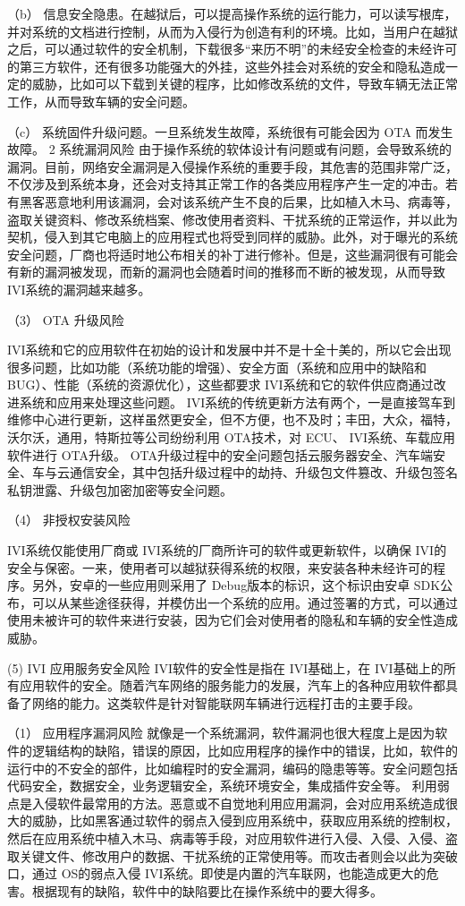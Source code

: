 （b） 信息安全隐患。在越狱后，可以提高操作系统的运行能力，可以读写根库，并对系统的文档进行控制，从而为入侵行为创造有利的环境。比如，当用户在越狱之后，可以通过软件的安全机制，下载很多“来历不明”的未经安全检查的未经许可的第三方软件，还有很多功能强大的外挂，这些外挂会对系统的安全和隐私造成一定的威胁，比如可以下载到关键的程序，比如修改系统的文件，导致车辆无法正常工作，从而导致车辆的安全问题。 

（c） 系统固件升级问题。一旦系统发生故障，系统很有可能会因为 OTA 而发生故障。
2 系统漏洞风险    
由于操作系统的软体设计有问题或有问题，会导致系统的漏洞。目前，网络安全漏洞是入侵操作系统的重要手段，其危害的范围非常广泛，不仅涉及到系统本身，还会对支持其正常工作的各类应用程序产生一定的冲击。若有黑客恶意地利用该漏洞，会对该系统产生不良的后果，比如植入木马、病毒等，盗取关键资料、修改系统档案、修改使用者资料、干扰系统的正常运作，并以此为契机，侵入到其它电脑上的应用程式也将受到同样的威胁。此外，对于曝光的系统安全问题，厂商也将适时地公布相关的补丁进行修补。但是，这些漏洞很有可能会有新的漏洞被发现，而新的漏洞也会随着时间的推移而不断的被发现，从而导致 IVI系统的漏洞越来越多。

（3） OTA 升级风险 

IVI系统和它的应用软件在初始的设计和发展中并不是十全十美的，所以它会出现很多问题，比如功能（系统功能的增强）、安全方面（系统和应用中的缺陷和 BUG）、性能（系统的资源优化），这些都要求 IVI系统和它的软件供应商通过改进系统和应用来处理这些问题。
IVI系统的传统更新方法有两个，一是直接驾车到维修中心进行更新，这样虽然更安全，但不方便，也不及时；丰田，大众，福特，沃尔沃，通用，特斯拉等公司纷纷利用 OTA技术，对 ECU、 IVI系统、车载应用软件进行 OTA升级。
OTA升级过程中的安全问题包括云服务器安全、汽车端安全、车与云通信安全，其中包括升级过程中的劫持、升级包文件篡改、升级包签名私钥泄露、升级包加密加密等安全问题。

（4） 非授权安装风险 

IVI系统仅能使用厂商或 IVI系统的厂商所许可的软件或更新软件，以确保 IVI的安全与保密。一来，使用者可以越狱获得系统的权限，来安装各种未经许可的程序。另外，安卓的一些应用则采用了 Debug版本的标识，这个标识由安卓 SDK公布，可以从某些途径获得，并模仿出一个系统的应用。通过签署的方式，可以通过使用未被许可的软件来进行安装，因为它们会对使用者的隐私和车辆的安全性造成威胁。 

(5) IVI 应用服务安全风险 
IVI软件的安全性是指在 IVI基础上，在 IVI基础上的所有应用软件的安全。随着汽车网络的服务能力的发展，汽车上的各种应用软件都具备了网络的能力。这类软件是针对智能联网车辆进行远程打击的主要手段。

（1） 应用程序漏洞风险 
就像是一个系统漏洞，软件漏洞也很大程度上是因为软件的逻辑结构的缺陷，错误的原因，比如应用程序的操作中的错误，比如，软件的运行中的不安全的部件，比如编程时的安全漏洞，编码的隐患等等。安全问题包括代码安全，数据安全，业务逻辑安全，系统环境安全，集成插件安全等。
利用弱点是入侵软件最常用的方法。恶意或不自觉地利用应用漏洞，会对应用系统造成很大的威胁，比如黑客通过软件的弱点入侵到应用系统中，获取应用系统的控制权，然后在应用系统中植入木马、病毒等手段，对应用软件进行入侵、入侵、入侵、盗取关键文件、修改用户的数据、干扰系统的正常使用等。而攻击者则会以此为突破口，通过 OS的弱点入侵 IVI系统。即使是内置的汽车联网，也能造成更大的危害。根据现有的缺陷，软件中的缺陷要比在操作系统中的要大得多。

